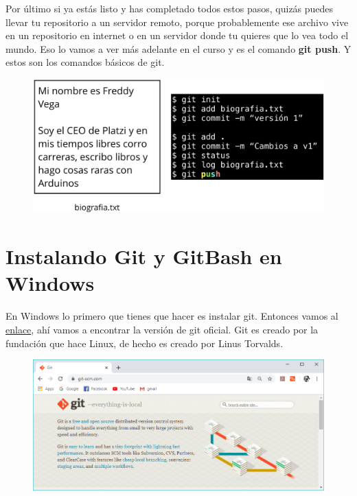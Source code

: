 \documentclass{article}
\begin{document}
Por último si ya estás listo y has completado todos estos pasos, quizás puedes
llevar tu repositorio a un servidor remoto, porque probablemente ese archivo
vive en un repositorio en internet o en un servidor donde tu quieres que lo vea
todo el mundo. Eso lo vamos a ver más adelante en el curso y es el comando
\textbf{git push}. Y estos son los comandos básicos de git.

\begin{figure}[h!]
  \centering
  \includegraphics[scale=0.5]{./Pictures/011_basicos.png}
\end{figure}

\newpage

\section{Instalando Git y GitBash en Windows}%
En Windows lo primero que tienes que hacer es instalar git. Entonces vamos al
\href{https://git-scm.com/}{enlace}, ahí vamos a encontrar la versión de git
oficial. Git es creado por la fundación que hace Linux, de hecho es creado por
Linus Torvalds.

\begin{figure}[h!]
  \centering
  \includegraphics[scale=0.5]{./Pictures/011_gitbash.png}
\end{figure}
\end{document}
